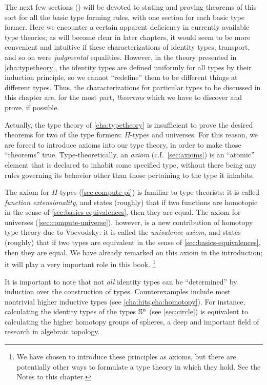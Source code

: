The next few sections () will be devoted to stating and proving theorems of this sort for all the basic type forming rules, with one section for each basic type former.
Here we encounter a certain apparent deficiency in currently available type theories;
as will become clear in later chapters, it would seem to be more convenient and intuitive if these characterizations of identity types, transport, and so on were \emph{judgmental} equalities.
However, in the theory presented in \cref{cha:typetheory}, the identity types are defined uniformly for all types by their induction principle, so we cannot ``redefine'' them to be different things at different types.
Thus, the characterizations for particular types to be discussed in this chapter are, for the most part, \emph{theorems} which we have to discover and prove, if possible.

Actually, the type theory of \cref{cha:typetheory} is insufficient to prove the desired theorems for two of the type formers: $\Pi$-types and universes.
For this reason, we are forced to introduce axioms into our type theory, in order to make those ``theorems'' true.
Type-theoretically, an \emph{axiom} (c.f.~\cref{sec:axioms}) is an ``atomic'' element that is declared to inhabit some specified type, without there being any rules governing its behavior other than those pertaining to the type it inhabits.
%

%
%
The axiom for $\Pi$-types (\cref{sec:compute-pi}) is familiar to type theorists: it is called \emph{function extensionality}, and states (roughly) that if two functions are homotopic in the sense of \cref{sec:basics-equivalences}, then they are equal.
The axiom for universes (\cref{sec:compute-universe}), however, is a new contribution of homotopy type theory due to Voevodsky: it is called the \emph{univalence axiom}, and states (roughly) that if two types are equivalent in the sense of \cref{sec:basics-equivalences}, then they are equal.
We have already remarked on this axiom in the introduction; it will play a very important role in this book.%
\footnote{We have chosen to introduce these principles as axioms, but there are potentially other ways to formulate a type theory in which they hold.
  See the Notes to this chapter.}

It is important to note that not \emph{all} identity types can be ``determined'' by induction over the construction of types.
Counterexamples include most nontrivial higher inductive types (see \cref{cha:hits,cha:homotopy}).
For instance, calculating the identity types of the types $\mathbb{S}^n$ (see \cref{sec:circle}) is equivalent to calculating the higher homotopy groups of spheres, a deep and important field of research in algebraic topology.



